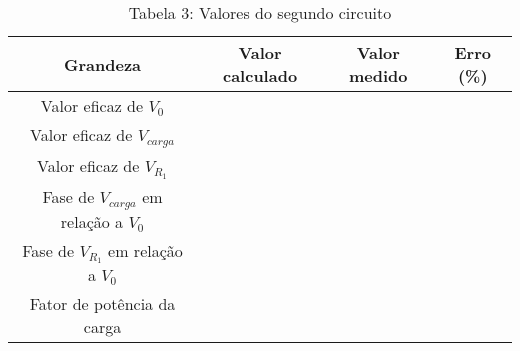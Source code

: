 \vspace{5pt}
\begin{table}[h]
\centering
\begin{tabular}{|c|c|c|c|}
\hline
\textbf{Grandeza} & \textbf{Valor calculado} & \textbf{Valor medido} & \textbf{Erro (\%) }\\\hline
Valor eficaz de $V_0$ & & & \\\hline
Valor eficaz de $V_{carga}$ & & & \\\hline
Valor eficaz de $V_{R_1}$ & & & \\\hline
Fase de $V_{carga}$ em relação a $V_0$ & & & \\\hline
Fase de $V_{R_1}$ em relação a $V_0$ & & & \\\hline
Fator de potência da carga & & & \\\hline
\end{tabular}
\caption*{Tabela 3: Valores do segundo circuito}
\end{table}